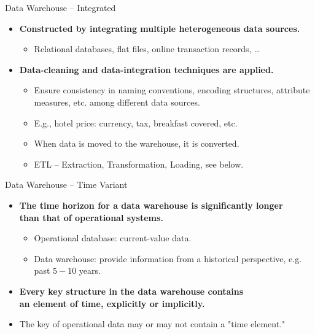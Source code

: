 \begin{frame}{Data Warehouse -- Integrated}
	\begin{itemize}
		\item \textbf{Constructed by {\color{airforceblue}integrating multiple heterogeneous data sources}.}
		      \begin{itemize}
			      \item Relational databases, flat files, online transaction records, \ldots
		      \end{itemize}
		\item \textbf{Data-cleaning and data-integration techniques are applied.}
		      \begin{itemize}
			      \item Ensure consistency in naming conventions, encoding structures, attribute measures, etc. among different data sources.
			      \item E.g., hotel price: currency, tax, breakfast covered, etc.
			      \item When data is moved to the warehouse, it is converted.
			      \item ETL -- Extraction, Transformation, Loading, see below.
		      \end{itemize}
	\end{itemize}
\end{frame}

\begin{frame}{Data Warehouse -- Time Variant}
	\begin{itemize}
		\item \textbf{The {\color{airforceblue}time horizon} for a data warehouse is {\color{airforceblue}significantly longer} \\
			      than that of operational systems.}
		      \begin{itemize}
			      \item Operational database: current-value data.
			      \item Data warehouse: provide information from a historical perspective, e.g. past $5-10$ years.
		      \end{itemize}
		\item \textbf{Every key structure in the data warehouse contains \\
			      an element of time, explicitly or implicitly.}
		\item The key of operational data may or may not contain a "time element."
	\end{itemize}
\end{frame}

